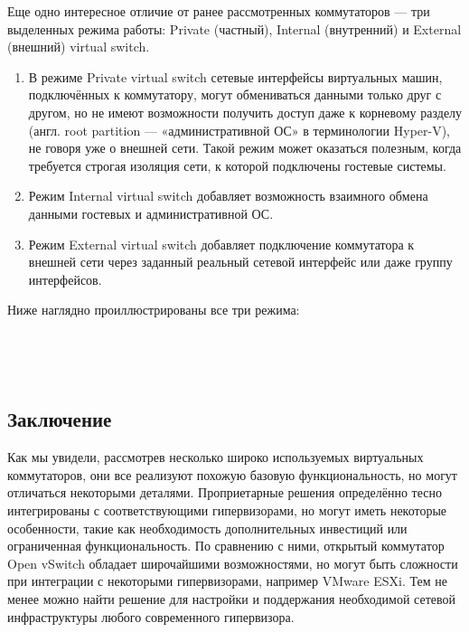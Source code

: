 \documentclass[14pt, a4paper]{article}
\begin{document}
Еще одно интересное отличие от ранее рассмотренных коммутаторов — три выделенных режима
работы: Private (частный), Internal (внутренний) и External (внешний) virtual switch.

\begin{enumerate}
    \item В режиме Private virtual switch сетевые интерфейсы виртуальных машин, подключённых к
    коммутатору, могут обмениваться данными только друг с другом, но не имеют возможности
    получить доступ даже к корневому разделу (англ. root partition — «административной ОС» в
    терминологии Hyper-V), не говоря уже о внешней сети. Такой режим может оказаться
    полезным, когда требуется строгая изоляция сети, к которой подключены гостевые системы.
    \item Режим Internal virtual switch добавляет возможность взаимного обмена данными гостевых и
    административной ОС.
    \item Режим External virtual switch добавляет подключение коммутатора к внешней сети через
    заданный реальный сетевой интерфейс или даже группу интерфейсов.
\end{enumerate}

Ниже наглядно проиллюстрированы все три режима:

\begin{figure}[h]
    \centering
     \\
    \label{framework} 
\end{figure}

\newpage

\begin{figure}[h]
    \centering
     \\
    \label{framework} 
\end{figure}

\begin{figure}[h]
    \centering
    \label{framework} 
\end{figure}

\subsection*{Заключение} 

Как мы увидели, рассмотрев несколько широко используемых виртуальных коммутаторов, они все
реализуют похожую базовую функциональность, но могут отличаться некоторыми деталями.
Проприетарные решения определённо тесно интегрированы с соответствующими гипервизорами, но
могут иметь некоторые особенности, такие как необходимость дополнительных инвестиций или
ограниченная функциональность. По сравнению с ними, открытый коммутатор Open vSwitch обладает
широчайшими возможностями, но могут быть сложности при интеграции с некоторыми
гипервизорами, например VMware ESXi. Тем не менее можно найти решение для настройки и
поддержания необходимой сетевой инфраструктуры любого современного гипервизора.\\
\end{document}
